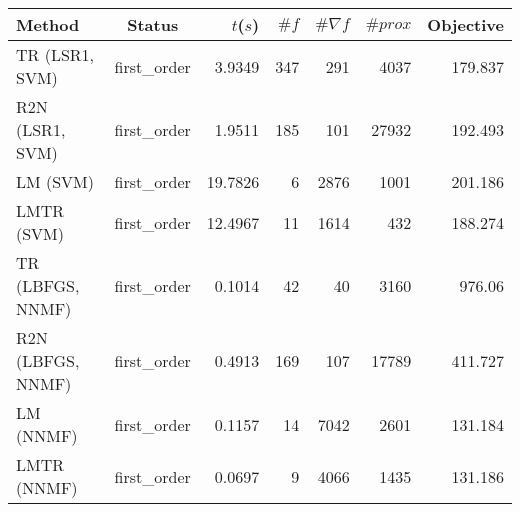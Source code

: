 \begin{tabular}{lcrrrrr}
  \hline
  \textbf{Method} & \textbf{Status} & \textbf{$t$($s$)} & \textbf{$\#f$} & \textbf{$\#\nabla f$} & \textbf{$\#prox$} & \textbf{Objective} \\\hline
  TR (LSR1, SVM) & first\_order & 3.9349 & 347 & 291 & 4037 & 179.837 \\
  R2N (LSR1, SVM) & first\_order & 1.9511 & 185 & 101 & 27932 & 192.493 \\
  LM (SVM) & first\_order & 19.7826 & 6 & 2876 & 1001 & 201.186 \\
  LMTR (SVM) & first\_order & 12.4967 & 11 & 1614 & 432 & 188.274 \\
  \hline
  TR (LBFGS, NNMF) & first\_order & 0.1014 & 42 & 40 & 3160 & 976.06 \\
  R2N (LBFGS, NNMF) & first\_order & 0.4913 & 169 & 107 & 17789 & 411.727 \\
  LM (NNMF) & first\_order & 0.1157 & 14 & 7042 & 2601 & 131.184 \\
  LMTR (NNMF) & first\_order & 0.0697 & 9 & 4066 & 1435 & 131.186 \\\hline
\end{tabular}
